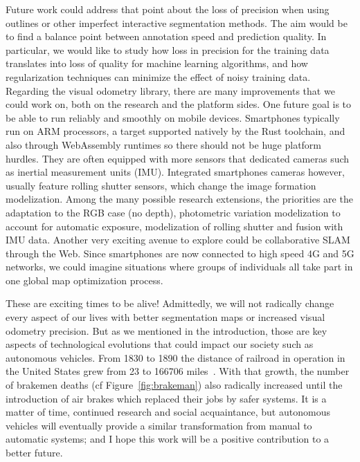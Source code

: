 Future work could address that point about the loss of precision when using outlines
or other imperfect interactive segmentation methods.
The aim would be to find a balance point between annotation speed and prediction quality.
In particular, we would like to study how loss in precision for the training data translates
into loss of quality for machine learning algorithms,
and how regularization techniques can minimize the effect of noisy training data.
Regarding the visual odometry library, there are many improvements that we could work on,
both on the research and the platform sides.
One future goal is to be able to run reliably and smoothly on mobile devices.
Smartphones typically run on ARM processors, a target supported natively
by the Rust toolchain, and also through WebAssembly runtimes so there should not be
huge platform hurdles.
They are often equipped with more sensors that dedicated cameras
such as inertial measurement units (IMU).
Integrated smartphones cameras however, usually feature rolling shutter sensors,
which change the image formation modelization.
Among the many possible research extensions, the priorities are
the adaptation to the RGB case (no depth),
photometric variation modelization to account for automatic exposure,
modelization of rolling shutter and fusion with IMU data.
Another very exciting avenue to explore could be collaborative
SLAM through the Web.
Since smartphones are now connected to high speed 4G and 5G networks,
we could imagine situations where groups of individuals all take part
in one global map optimization process.

These are exciting times to be alive!
Admittedly, we will not radically change every aspect of our lives
with better segmentation maps or increased visual odometry precision.
But as we mentioned in the introduction, those are key aspects
of technological evolutions that could impact our society such as autonomous vehicles.
From 1830 to 1890 the distance of railroad in operation in the United States
grew from 23 to 166706 miles~\cite{depew1895one}.
With that growth, the number of brakemen deaths (cf Figure~\ref{fig:brakeman}) also radically
increased until the introduction of air brakes which replaced their jobs by safer systems.
It is a matter of time, continued research and social acquaintance,
but autonomous vehicles will eventually provide a similar transformation
from manual to automatic systems; and
I hope this work will be a positive contribution to a better future.


